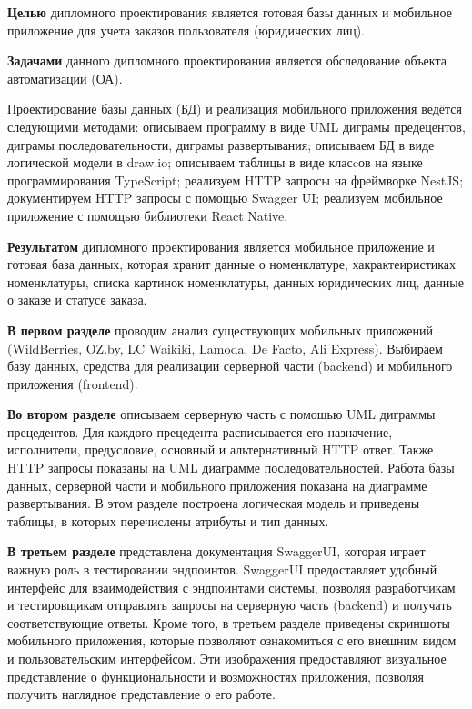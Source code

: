 
\textbf{Целью} дипломного проектирования является готовая базы данных и мобильное приложение
для учета заказов пользователя (юридических лиц).

\textbf{Задачами} данного дипломного проектирования является обследование объекта автоматизации (ОА).

Проектирование базы данных (БД) и реализация мобильного приложения ведётся следующими методами:
описываем программу в виде UML диграмы предецентов, диграмы последовательности, диграмы развертывания;
описываем БД в виде логической модели в draw.io; описываем таблицы в виде класcов на языке программирования TypeScript;
реализуем HTTP запросы на фреймворке NestJS; документируем HTTP запросы с помощью Swagger UI;
реализуем мобильное приложение с помощью библиотеки React Native.

\textbf{Результатом} дипломного проектирования является мобильное приложение и готовая база данных,
которая хранит данные о номенклатуре,
хакрактеиристиках номенклатуры,
списка картинок номенклатуры,
данных юридических лиц,
данные о заказе и статусе заказа.

\textbf{В первом разделе}
проводим анализ существующих мобильных приложений
(WildBerries, OZ.by, LC Waikiki, Lamoda, De Facto, Ali Express).
Выбираем базу данных, средства для реализации серверной части (backend) и мобильного приложения (frontend).

\textbf{Во втором разделе}
описываем серверную часть с помощью UML диграммы прецедентов.
Для каждого прецедента расписывается его назначение, исполнители, предусловие, основный и альтернативный HTTP ответ.
Также HTTP запросы показаны на UML диаграмме последовательностей.
Работа базы данных, серверной части и мобильного приложения показана на диаграмме развертывания.
В этом разделе построена логическая модель и приведены таблицы,
в которых перечислены атрибуты и тип данных.

\textbf{В третьем разделе}
представлена документация SwaggerUI, которая играет важную роль в тестировании эндпоинтов.
SwaggerUI предоставляет удобный интерфейс для взаимодействия с эндпоинтами системы,
позволяя разработчикам и тестировщикам отправлять запросы на серверную часть (backend)
и получать соответствующие ответы.
Кроме того, в третьем разделе приведены скриншоты мобильного приложения,
которые позволяют ознакомиться с его внешним видом и пользовательским интерфейсом.
Эти изображения предоставляют визуальное представление о функциональности и возможностях приложения,
позволяя получить наглядное представление о его работе.

